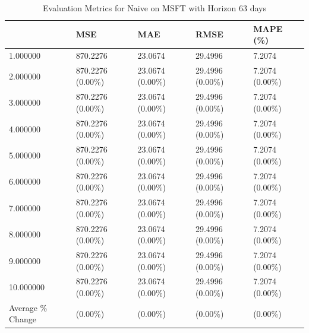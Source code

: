 \begin{table}
\caption{Evaluation Metrics for Naive on MSFT with Horizon 63 days}
\label{tab:naive_MSFT_h63_metrics}
\begin{tabular}{lllll}
\toprule
 & MSE & MAE & RMSE & MAPE (\%) \\
\midrule
1.000000 & 870.2276 & 23.0674 & 29.4996 & 7.2074 \\
2.000000 & 870.2276 (0.00\%) & 23.0674 (0.00\%) & 29.4996 (0.00\%) & 7.2074 (0.00\%) \\
3.000000 & 870.2276 (0.00\%) & 23.0674 (0.00\%) & 29.4996 (0.00\%) & 7.2074 (0.00\%) \\
4.000000 & 870.2276 (0.00\%) & 23.0674 (0.00\%) & 29.4996 (0.00\%) & 7.2074 (0.00\%) \\
5.000000 & 870.2276 (0.00\%) & 23.0674 (0.00\%) & 29.4996 (0.00\%) & 7.2074 (0.00\%) \\
6.000000 & 870.2276 (0.00\%) & 23.0674 (0.00\%) & 29.4996 (0.00\%) & 7.2074 (0.00\%) \\
7.000000 & 870.2276 (0.00\%) & 23.0674 (0.00\%) & 29.4996 (0.00\%) & 7.2074 (0.00\%) \\
8.000000 & 870.2276 (0.00\%) & 23.0674 (0.00\%) & 29.4996 (0.00\%) & 7.2074 (0.00\%) \\
9.000000 & 870.2276 (0.00\%) & 23.0674 (0.00\%) & 29.4996 (0.00\%) & 7.2074 (0.00\%) \\
10.000000 & 870.2276 (0.00\%) & 23.0674 (0.00\%) & 29.4996 (0.00\%) & 7.2074 (0.00\%) \\
Average \% Change & (0.00\%) & (0.00\%) & (0.00\%) & (0.00\%) \\
\bottomrule
\end{tabular}
\end{table}
